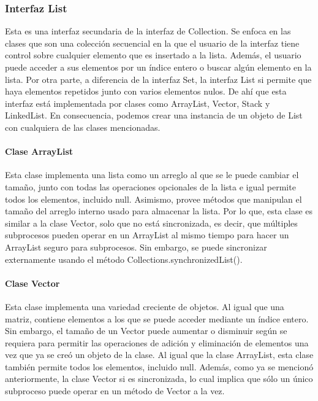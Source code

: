 \documentclass{report}
\begin{document}
\subsubsection{Interfaz List}
Esta es una interfaz secundaria de la interfaz de Collection. Se enfoca en las clases que son una colección secuencial en la que el usuario de la interfaz tiene control sobre cualquier elemento que es insertado a la lista. Además, el usuario puede acceder a sus elementos por un índice entero o buscar algún elemento en la lista. Por otra parte, a diferencia de la interfaz Set, la interfaz List si permite que haya elementos repetidos junto con varios elementos nulos. De ahí que esta interfaz está implementada por clases como ArrayList, Vector, Stack y LinkedList. En consecuencia, podemos crear una instancia de un objeto de List con cualquiera de las clases mencionadas.
\paragraph{Clase ArrayList}
Esta clase implementa una lista como un arreglo al que se le puede cambiar el tamaño, junto con todas las operaciones opcionales de la lista e igual permite todos los elementos, incluido null. Asimismo, provee métodos que manipulan el tamaño del arreglo interno usado para almacenar la lista. Por lo que, esta clase es similar a la clase Vector, solo que no está sincronizada, es decir, que múltiples subprocesos pueden operar en un ArrayList al mismo tiempo para hacer un ArrayList seguro para subprocesos. Sin embargo, se puede sincronizar externamente usando el método Collections.synchronizedList().
\paragraph{Clase Vector}
Esta clase implementa una variedad creciente de objetos. Al igual que una matriz, contiene elementos a los que se puede acceder mediante un índice entero. Sin embargo, el tamaño de un Vector puede aumentar o disminuir según se requiera para permitir las operaciones de adición y eliminación de elementos una vez que ya se creó un objeto de la clase. Al igual que la clase ArrayList, esta clase también permite todos los elementos, incluido null.  Además, como ya se mencionó anteriormente, la clase Vector si es sincronizada, lo cual implica que sólo un único subproceso puede operar en un método de Vector a la vez.
\end{document}
